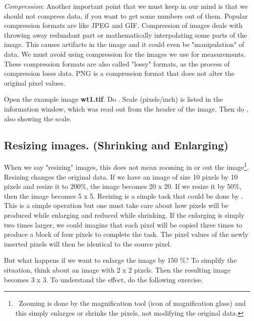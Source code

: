 \textit{Compression}: Another important point that we must keep in our mind is that we should not compress data, if you want to get some numbers out of them. Popular compression formats are like JPEG and GIF. Compression of images deals with throwing away redundant part or mathematically interpolating some parts of the image. This causes artifacts in the image and it could even be "manipulation" of data. We must avoid using compression for the images we use for measurements. These compression formats are also called "lossy" formats, as the process of compression loses data. PNG is a compression format that does not alter the original pixel values.

\begin{indentexercise}{1}
Open the example image \textbf{wt1.tif}. Do
. Scale (pixels/inch)
is listed in the information window, which was read out from the header
of the image. Then do ,
also showing the scale. 
\end{indentexercise}

\subsection{Resizing images. (Shrinking and Enlarging) }

When we say "resizing" images, this
does not mean zooming in or out the image\footnote{\ Zooming is done by
the magnification tool (icon of magnification glass) and this simply
enlarges or shrinks the pixels, not modifying the original data. \par
}. Resizing changes the original data. If we have an image of size 10
pixels by 10 pixels and resize it to 200\%, the image becomes 20 x 20.
If we resize it by 50\%, then the image becomes 5 x 5. Resizing is a
simple task that could be done by . This is a simple operation but one must
take care about how pixels will be produced while enlarging and reduced
while shrinking. If the enlarging is simply two times larger, we could
imagine that each pixel will be copied three times to produce a block
of four pixels to complete the task. The pixel values of the newly
inserted pixels will then be identical to the source pixel. 

But what happens if we want to enlarge the image by 150 \%? To simplify
the situation, think about an image with 2 x 2 pixels. Then the
resulting image becomes 3 x 3. To understand the effect, do the
following exercise. 


